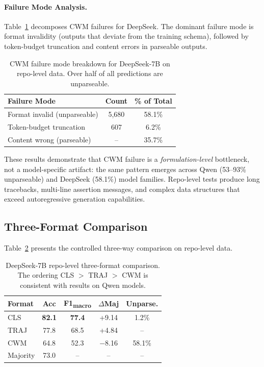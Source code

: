 \documentclass[11pt,a4paper]{article}
\begin{document}
\paragraph{Failure Mode Analysis.}
Table~\ref{tab:cwm-failure} decomposes CWM failures for DeepSeek.
The dominant failure mode is format invalidity (outputs that deviate from the training schema), followed by token-budget truncation and content errors in parseable outputs.

\begin{table}[t]
\centering
\small
\begin{tabular}{lcc}
\toprule
\textbf{Failure Mode} & \textbf{Count} & \textbf{\% of Total} \\
\midrule
Format invalid (unparseable) & 5,680 & 58.1\% \\
Token-budget truncation & 607 & 6.2\% \\
Content wrong (parseable) & -- & 35.7\% \\
\bottomrule
\end{tabular}
\caption{CWM failure mode breakdown for DeepSeek-7B on repo-level data. Over half of all predictions are unparseable.}
\label{tab:cwm-failure}
\end{table}

These results demonstrate that CWM failure is a \emph{formulation-level} bottleneck, not a model-specific artifact: the same pattern emerges across Qwen (53--93\% unparseable) and DeepSeek (58.1\%) model families.
Repo-level tests produce long tracebacks, multi-line assertion messages, and complex data structures that exceed autoregressive generation capabilities.

\subsection{Three-Format Comparison}
\label{sec:three-format}

Table~\ref{tab:three-format} presents the controlled three-way comparison on repo-level data.

\begin{table}[t]
\centering
\small
\begin{tabular}{lcccc}
\toprule
\textbf{Format} & \textbf{Acc} & \textbf{F1\textsubscript{macro}} & \textbf{$\Delta$Maj} & \textbf{Unparse.} \\
\midrule
CLS & \textbf{82.1} & \textbf{77.4} & +9.14 & 1.2\% \\
TRAJ & 77.8 & 68.5 & +4.84 & -- \\
CWM & 64.8 & 52.3 & $-$8.16 & 58.1\% \\
\midrule
Majority & 73.0 & -- & -- & -- \\
\bottomrule
\end{tabular}
\caption{DeepSeek-7B repo-level three-format comparison. The ordering CLS $>$ TRAJ $>$ CWM is consistent with results on Qwen models.}
\label{tab:three-format}
\end{table}
\end{document}
